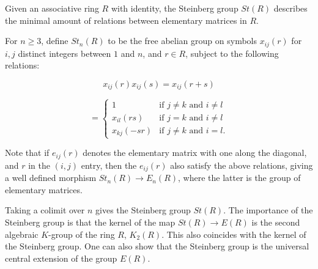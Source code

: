 \documentclass[12pt]{article}
\begin{document}
Given an associative ring $R$ with identity, the Steinberg group $St(R)$ describes the minimal amount of relations between elementary matrices in $R$.

For $n \geq 3$, define $St_n(R)$ to be the free abelian group on symbols $x_{ij}(r)$ for $i,j$ distinct integers between $1$ and $n$, and $r \in R$, subject to the following relations:

$$x_{ij}(r)x_{ij}(s) = x_{ij}(r+s)$$

\begin{equation*}
[x_{ij},x_{kl}] =
\begin{cases} 1 & \text{if $j \neq k$ and $i \neq l$} \\
x_{il}(rs) & \text{if $j = k$ and $i \neq l$} \\
x_{kj}(-sr) & \text{if $j \neq k$ and $i = l.$}
\end{cases}
\end{equation*}

Note that if $e_{ij}(r)$ denotes the elementary matrix with one along the diagonal, and $r$ in the $(i,j)$ entry, then the $e_{ij}(r)$ also satisfy the above relations, giving a well defined morphism $St_n(R) \to E_n(R)$, where the latter is the group of elementary matrices.

Taking a colimit over $n$ gives the Steinberg group $St(R)$. The importance of the Steinberg group is that the kernel of the map $St(R) \to E(R)$ is the second algebraic $K$-group of the ring $R$, $K_2(R)$. This also coincides with the kernel of the Steinberg group. One can also show that the Steinberg group is the universal central extension of the group $E(R)$.
\end{document}
